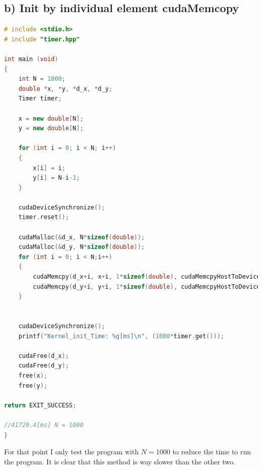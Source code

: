\documentclass[11pt,a4paper]{article}
\begin{document}
\subsection*{b) Init by individual element cudaMemcopy}
\begin{lstlisting}[language=C++, caption={code for b)}]
# include <stdio.h>
# include "timer.hpp"

int main (void)
{
	int N = 1000;
	double *x, *y, *d_x, *d_y;
	Timer timer;

	x = new double[N];
	y = new double[N];

	for (int i = 0; i < N; i++)
	{
		x[i] = i;
		y[i] = N-i-1;
	}

	cudaDeviceSynchronize();
	timer.reset();

	cudaMalloc(&d_x, N*sizeof(double));
	cudaMalloc(&d_y, N*sizeof(double));
	for (int i = 0; i < N;i++)
	{
		cudaMemcpy(d_x+i, x+i, 1*sizeof(double), cudaMemcpyHostToDevice);
		cudaMemcpy(d_y+i, y+i, 1*sizeof(double), cudaMemcpyHostToDevice);
	}


	cudaDeviceSynchronize();
	printf("Kernel_init_Time: %g[ms]\n", (1000*timer.get()));

	cudaFree(d_x);
	cudaFree(d_y);
	free(x);
	free(y);

return EXIT_SUCCESS;

//41729.4[ms] N = 1000
}
\end{lstlisting}
For that point I only test the program with $N = 1000$ to reduce the time to run the program. It is clear that this method is way slower than the other two.
\newpage
\end{document}
